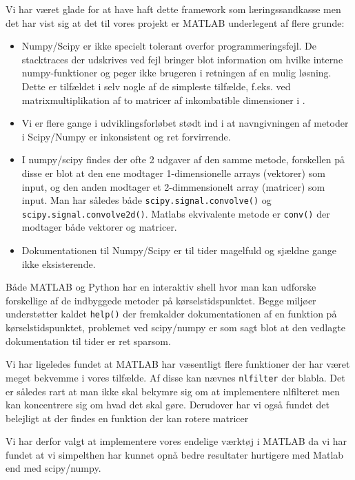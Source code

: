 Vi har været glade for at have haft dette framework som 
læringssandkasse men det har vist sig at det til vores projekt er MATLAB underlegent af flere grunde:
\begin{itemize}
	\item Numpy/Scipy er ikke specielt tolerant overfor programmeringsfejl. De stacktraces der udskrives ved fejl bringer blot information om hvilke interne numpy-funktioner og peger ikke brugeren i retningen af en mulig løsning. Dette er tilfældet i selv nogle af de simpleste tilfælde, f.eks. ved matrixmultiplikation af to matricer af inkombatible dimensioner i %
	.
	\item Vi er flere gange i udviklingsforløbet stødt ind i at navngivningen af metoder i Scipy/Numpy er inkonsistent og ret forvirrende. 
	\item I numpy/scipy findes der ofte 2 udgaver af den samme metode, forskellen på disse er blot at den ene modtager 1-dimensionelle arrays (vektorer) som input, og den anden modtager et 2-dimmensionelt array (matricer) som input. Man har således både \texttt{scipy.signal.convolve()} og \texttt{scipy.signal.convolve2d()}. Matlabs ekvivalente metode er \texttt{conv()} der modtager både vektorer og matricer.
	\item Dokumentationen til Numpy/Scipy er til tider magelfuld og sjældne gange ikke eksisterende. 
\end{itemize}

Både MATLAB og Python har en interaktiv shell hvor man kan udforske forskellige af de indbyggede metoder på kørselstidspunktet. Begge miljøer understøtter kaldet \texttt{help()} der fremkalder dokumentationen af en funktion på kørselstidspunktet, problemet ved scipy/numpy er som sagt blot at den vedlagte dokumentation til tider er ret sparsom.

Vi har ligeledes fundet at MATLAB har væsentligt flere funktioner der har været meget bekvemme i vores tilfælde. Af disse kan nævnes \texttt{nlfilter} der blabla. Det er således rart at man ikke skal bekymre sig om at implementere nlfilteret men kan koncentrere sig om hvad det skal gøre. 
Derudover har vi også fundet det belejligt at der findes en funktion der kan rotere matricer 

Vi har derfor valgt at implementere vores endelige værktøj i MATLAB da vi har fundet at vi simpelthen har kunnet opnå bedre resultater hurtigere med Matlab end med scipy/numpy. %
